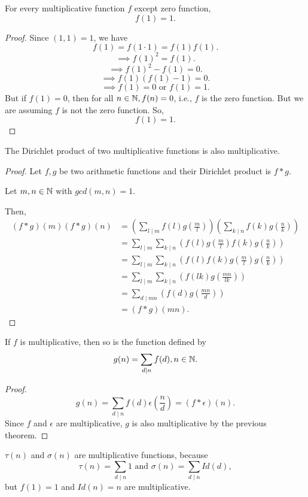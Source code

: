 \begin{lemma}\label{lem:multiplicativeone}
    For every multiplicative function $f$ except zero function, \[f(1) = 1.\]
\end{lemma}
\begin{proof}
    Since $(1,1) = 1$, we have \[f(1) = f(1 \cdot 1) = f(1)f(1).\]
    \[\implies f(1)^2 = f(1).\]
    \[\implies f(1)^2 - f(1) = 0.\]
    \[\implies f(1)(f(1) - 1) = 0.\]
    \[\implies f(1) = 0 \text{ or } f(1) = 1.\]
    But if $f(1) = 0$, then for all $n \in \mathbb{N}, f(n) = 0$, i.e., $f$ is the zero function. But we are assuming $f$ is not the zero function. So, \[f(1) = 1.\]
\end{proof}

\begin{theorem}\label{thm:muldriprod}
    The Dirichlet product of two multiplicative functions is also multiplicative.
\end{theorem}
\begin{proof}
    Let $f, g$ be two arithmetic functions and their Dirichlet product is $f \ast g$. 

    Let $m, n \in \mathbb{N}$ with $gcd(m,n)=1$.

    Then, \begin{align*}
        (f \ast g)(m) (f \ast g)(n) &= \left(\sum_{l \mid m} f(l)g\left(\frac{m}{l}\right)\right) \left(\sum_{k \mid n} f(k)g\left(\frac{n}{k}\right)\right)\\
        &= \sum_{l \mid m} \sum_{k \mid n} \left(f(l) g\left(\frac{m}{l}\right) f(k) g\left(\frac{n}{k}\right)\right)\\
        &= \sum_{l \mid m} \sum_{k \mid n} \left(f(l) f(k) g\left(\frac{m}{l}\right) g\left(\frac{n}{k}\right)\right)\\
        &= \sum_{l \mid m} \sum_{k \mid n} \left(f(lk) g\left(\frac{mn}{lk}\right)\right)\\
        &= \sum_{d \mid mn} \left(f(d) g\left(\frac{mn}{d}\right)\right)\\
        &= (f \ast g)(mn).
    \end{align*}
\end{proof}

\begin{corollary}\label{cor:sumofmul}
    If $f$ is multiplicative, then so is the function defined by \[g(n) = \sum_{d \mid n} f(d), n \in \mathbb{N}.\]
\end{corollary}
\begin{proof}
    \[g(n) = \sum_{d \mid n} f(d) \epsilon\left(\frac{n}{d}\right) = (f \ast \epsilon)(n).\]
    Since $f$ and $\epsilon$ are multiplicative, $g$ is also multiplicative by the previous theorem.
\end{proof}
\begin{remark}
    $\tau(n)$ and $\sigma(n)$ are multiplicative functions, because \[\tau(n) = \sum_{d \mid n} 1 \text{ and } \sigma(n) = \sum_{d \mid n} Id(d),\] but $f(1) = 1$ and $Id(n) = n$ are multiplicative.
\end{remark}

